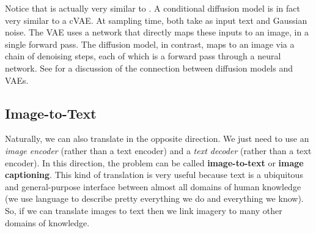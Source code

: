 Notice that \fig{\ref{fig:vision_and_language:text2im_diffusion_model}} is actually very similar to \fig{\ref{fig:vision_and_language:text2im_VAE_sampling}}. A conditional diffusion model is in fact very similar to a cVAE. At sampling time, both take as input text and Gaussian noise. The VAE uses a network that directly maps these inputs to an image, in a single forward pass. The diffusion model, in contrast, maps to an image via a chain of denoising steps, each of which is a forward pass through a neural network. See \cite{NEURIPS2021_b578f2a5} for a discussion of the connection between diffusion models and VAEs.


\subsection{Image-to-Text}\label{sec:VLMs:im2text}
Naturally, we can also translate in the opposite direction. We just need to use an \textit{image encoder} (rather than a text encoder) and a \textit{text decoder} (rather than a text encoder). In this direction, the problem can be called \textbf{image-to-text} or \textbf{image captioning}. This kind of translation is very useful because text is a ubiquitous and general-purpose interface between almost all domains of human knowledge (we use language to describe pretty everything we do and everything we know). So, if we can translate images to text then we link imagery to many other domains of knowledge.

